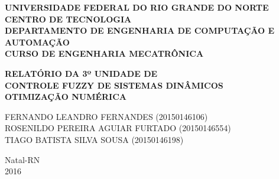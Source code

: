 \documentclass[a4paper,12pt]{article}
\begin{document}
\onehalfspacing

\thispagestyle{empty}

\setcounter{page}{1}


\begin{figure}[!ht]

\centering

\vspace{1cm}

\label{Logos}

\end{figure}


\vspace{-1cm}

\begin{center}
{\bf{\normalsize UNIVERSIDADE FEDERAL DO RIO GRANDE DO NORTE\\
CENTRO DE TECNOLOGIA\\
DEPARTAMENTO DE ENGENHARIA DE COMPUTAÇÃO E AUTOMAÇÃO\\
CURSO DE ENGENHARIA MECATRÔNICA
}}


\vspace{5cm}

{\bf{\large RELATÓRIO DA 3º UNIDADE DE \\CONTROLE FUZZY DE SISTEMAS DINÂMICOS\\
OTIMIZAÇÃO NUMÉRICA\\
}}


\vspace{2.6cm}



\begin{flushright}
\begin{normalsize}
FERNANDO LEANDRO FERNANDES (20150146106)\\
\vspace{0.8cm}
ROSENILDO PEREIRA AGUIAR FURTADO (20150146554)\\
\vspace{0.8cm}
TIAGO BATISTA SILVA SOUSA (20150146198)\\
\end{normalsize}
\end{flushright}


\vspace{3.6cm}
{\large Natal-RN\\
2016}
\end{center}
\end{document}
